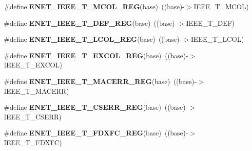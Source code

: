 \begin{DoxyCompactItemize}
\item 
\#define {\bfseries E\+N\+E\+T\+\_\+\+I\+E\+E\+E\+\_\+\+T\+\_\+\+M\+C\+O\+L\+\_\+\+R\+EG}(base)~((base)-\/$>$I\+E\+E\+E\+\_\+\+T\+\_\+\+M\+C\+OL)\hypertarget{group__ENET__Register__Accessor__Macros_ga0aaac49fdc27a1ab4903f285857782ee}{}\label{group__ENET__Register__Accessor__Macros_ga0aaac49fdc27a1ab4903f285857782ee}

\item 
\#define {\bfseries E\+N\+E\+T\+\_\+\+I\+E\+E\+E\+\_\+\+T\+\_\+\+D\+E\+F\+\_\+\+R\+EG}(base)~((base)-\/$>$I\+E\+E\+E\+\_\+\+T\+\_\+\+D\+EF)\hypertarget{group__ENET__Register__Accessor__Macros_ga1bda43a4f9681420b2904c8a4a237894}{}\label{group__ENET__Register__Accessor__Macros_ga1bda43a4f9681420b2904c8a4a237894}

\item 
\#define {\bfseries E\+N\+E\+T\+\_\+\+I\+E\+E\+E\+\_\+\+T\+\_\+\+L\+C\+O\+L\+\_\+\+R\+EG}(base)~((base)-\/$>$I\+E\+E\+E\+\_\+\+T\+\_\+\+L\+C\+OL)\hypertarget{group__ENET__Register__Accessor__Macros_gacc53cc71e7d2ec19ed5b757cf704afbb}{}\label{group__ENET__Register__Accessor__Macros_gacc53cc71e7d2ec19ed5b757cf704afbb}

\item 
\#define {\bfseries E\+N\+E\+T\+\_\+\+I\+E\+E\+E\+\_\+\+T\+\_\+\+E\+X\+C\+O\+L\+\_\+\+R\+EG}(base)~((base)-\/$>$I\+E\+E\+E\+\_\+\+T\+\_\+\+E\+X\+C\+OL)\hypertarget{group__ENET__Register__Accessor__Macros_ga663c2333e0d9e070c6375664a6484104}{}\label{group__ENET__Register__Accessor__Macros_ga663c2333e0d9e070c6375664a6484104}

\item 
\#define {\bfseries E\+N\+E\+T\+\_\+\+I\+E\+E\+E\+\_\+\+T\+\_\+\+M\+A\+C\+E\+R\+R\+\_\+\+R\+EG}(base)~((base)-\/$>$I\+E\+E\+E\+\_\+\+T\+\_\+\+M\+A\+C\+E\+RR)\hypertarget{group__ENET__Register__Accessor__Macros_gabbc46d7144af318fd350e7735dfdfbb4}{}\label{group__ENET__Register__Accessor__Macros_gabbc46d7144af318fd350e7735dfdfbb4}

\item 
\#define {\bfseries E\+N\+E\+T\+\_\+\+I\+E\+E\+E\+\_\+\+T\+\_\+\+C\+S\+E\+R\+R\+\_\+\+R\+EG}(base)~((base)-\/$>$I\+E\+E\+E\+\_\+\+T\+\_\+\+C\+S\+E\+RR)\hypertarget{group__ENET__Register__Accessor__Macros_gac5d85890dd87f65b1b287a73687267ba}{}\label{group__ENET__Register__Accessor__Macros_gac5d85890dd87f65b1b287a73687267ba}

\item 
\#define {\bfseries E\+N\+E\+T\+\_\+\+I\+E\+E\+E\+\_\+\+T\+\_\+\+F\+D\+X\+F\+C\+\_\+\+R\+EG}(base)~((base)-\/$>$I\+E\+E\+E\+\_\+\+T\+\_\+\+F\+D\+X\+FC)\hypertarget{group__ENET__Register__Accessor__Macros_ga3ea6b0eb9ce457a56df7025225f1ce7b}{}\label{group__ENET__Register__Accessor__Macros_ga3ea6b0eb9ce457a56df7025225f1ce7b}


\end{DoxyCompactItemize}
